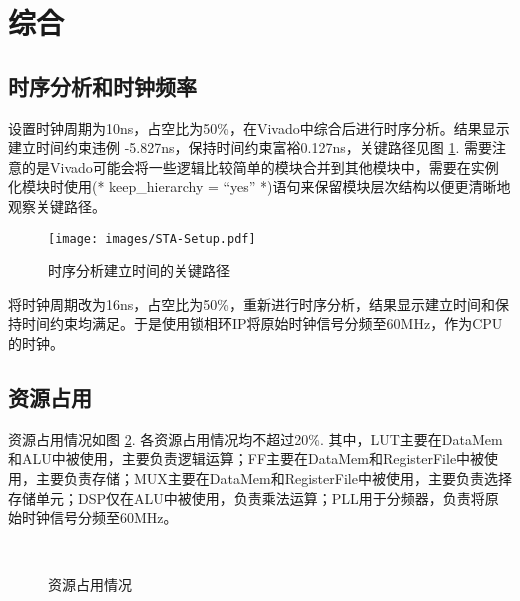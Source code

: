 \section{综合}

\subsection{时序分析和时钟频率}
设置时钟周期为10ns，占空比为50\%，在Vivado中综合后进行时序分析。结果显示建立时间约束违例 -5.827ns，保持时间约束富裕0.127ns，关键路径见图 \ref{fig:sta-setup}. 需要注意的是Vivado可能会将一些逻辑比较简单的模块合并到其他模块中，需要在实例化模块时使用(* keep\_hierarchy = ``yes'' *)语句来保留模块层次结构以便更清晰地观察关键路径。

\begin{figure}[H]
    \centering
    \texttt{[image: images/STA-Setup.pdf]}
    \vspace{-2em}
    \caption{时序分析建立时间的关键路径}
    \label{fig:sta-setup}
\end{figure}

将时钟周期改为16ns，占空比为50\%，重新进行时序分析，结果显示建立时间和保持时间约束均满足。于是使用锁相环IP将原始时钟信号分频至60MHz，作为CPU的时钟。

\subsection{资源占用}
资源占用情况如图 \ref{fig:utilization}. 各资源占用情况均不超过20\%. 其中，LUT主要在DataMem和ALU中被使用，主要负责逻辑运算；FF主要在DataMem和RegisterFile中被使用，主要负责存储；MUX主要在DataMem和RegisterFile中被使用，主要负责选择存储单元；DSP仅在ALU中被使用，负责乘法运算；PLL用于分频器，负责将原始时钟信号分频至60MHz。

\begin{figure}[H]
    \centering
     \\
    \vspace{-1em}
    \caption{资源占用情况}
    \label{fig:utilization}
\end{figure}

